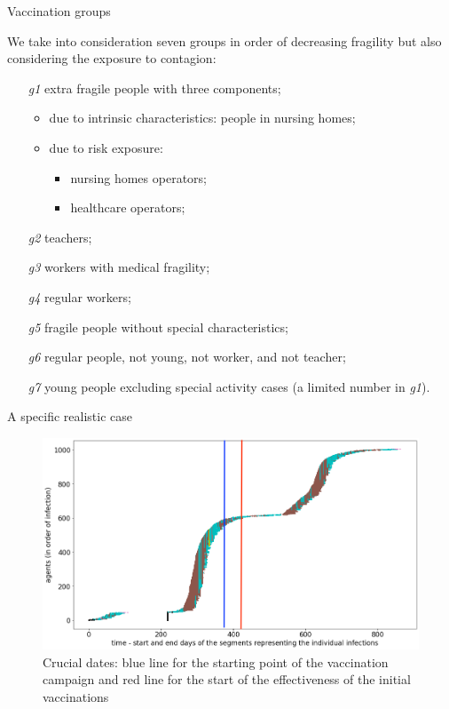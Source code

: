 \documentclass[9pt]{beamer}
\begin{document}
\begin{frame}{Vaccination groups}

We take into consideration seven groups in order of decreasing fragility but also considering the exposure to contagion:

\begin{enumerate}
\item [\emph{g1}]
	extra fragile people with three components;
	\begin{itemize}
		\item due to intrinsic characteristics: people in nursing homes;
		\item due to risk exposure:
		\begin{itemize}
			\item nursing homes operators;
			\item healthcare operators;
 		\end{itemize} 
 	\end{itemize}  
\item [\emph{g2}]
	teachers;
\item [\emph{g3}]
	workers with medical fragility;
\item [\emph{g4}]
	regular workers;
\item [\emph{g5}]
	fragile people without special characteristics;
\item [\emph{g6}]
	regular people, not young, not worker, and not teacher;
\item [\emph{g7}]
	young people excluding special activity cases (a limited number in \emph{g1}).
\end{enumerate}

\end{frame}

\begin{frame}{A specific realistic case}

\begin{figure}[H]
\center
\includegraphics[scale=0.2]{CaseForGA_I_base.png}
\caption{Crucial dates: blue line for the starting point of the vaccination campaign and red line for the start of the effectiveness of the initial vaccinations}
\label{specificCase}
\end{figure}

\end{frame}
\end{document}
